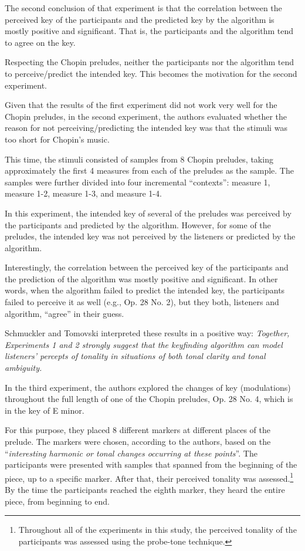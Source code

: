The second conclusion of that experiment is that the
correlation between the perceived key of the participants
and the predicted key by the algorithm is mostly positive
and significant. That is, the participants and the algorithm
tend to agree on the key.

Respecting the Chopin preludes, neither the participants nor
the algorithm tend to perceive/predict the intended key.
This becomes the motivation for the second experiment.


Given that the results of the first experiment did not work
very well for the Chopin preludes, in the second experiment,
the authors evaluated whether the reason for not
perceiving/predicting the intended key was that the stimuli
was too short for Chopin's music.

This time, the stimuli consisted of samples from 8 Chopin
preludes, taking approximately the first 4 measures from
each of the preludes as the sample. The samples were further
divided into four incremental ``contexts'': measure 1,
measure 1-2, measure 1-3, and measure 1-4.

In this experiment, the intended key of several of the
preludes was perceived by the participants and predicted by
the algorithm. However, for some of the preludes, the
intended key was not perceived by the listeners or predicted
by the algorithm.

Interestingly, the correlation between the perceived key of
the participants and the prediction of the algorithm was
mostly positive and significant. In other words, when the
algorithm failed to predict the intended key, the
participants failed to perceive it as well (e.g., Op. 28 No.
2), but they both, listeners and algorithm, ``agree'' in
their guess.

Schmuckler and Tomovski interpreted these results in a
positive way: \emph{Together, Experiments 1 and 2 strongly
suggest that the keyfinding algorithm can model listeners’
percepts of tonality in situations of both tonal clarity and
tonal ambiguity.}


In the third experiment, the authors explored the changes of
key (modulations) throughout the full length of one of the
Chopin preludes, Op. 28 No. 4, which is in the key of E
minor.

For this purpose, they placed 8 different markers at
different places of the prelude. The markers were chosen,
according to the authors, based on the ``\emph{interesting
harmonic or tonal changes occurring at these points}''. The
participants were presented with samples that spanned from
the beginning of the piece, up to a specific marker. After
that, their perceived tonality was
assessed.\footnote{Throughout all of the experiments in this
study, the perceived tonality of the participants was
assessed using the probe-tone technique.} By the time the
participants reached the eighth marker, they heard the
entire piece, from beginning to end.

